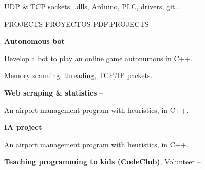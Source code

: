 \documentclass[letterpaper,MMMyyyy,nonstopmode]{simpleresumecv}
\newcommand\tab[1][0.5cm]{\hspace*{#1}}
\begin{document}
\begin{Body}
\tab UDP \& TCP sockets, .dlls, Arduino, PLC, drivers, git... 



\Gap



\Gap







\Gap

\hfill



\Section
{PROJECTS}
{PROYECTOS}
{PDF:PROJECTS}

\Entry



{\textbf{Autonomous bot}}
\hfill
{} --

\tab Develop a bot to play an online game autonumous in C++. 

\tab Memory scanning, threading, TCP/IP packets. 

\Gap


{\textbf{Web scraping \& statistics}}
\hfill
{} --

\tab  An airport management program with heuristics, in C++.

\Gap

{\textbf{IA project}}
\hfill
{}

\tab  An airport management program with heuristics, in C++.


\Gap

{\textbf{Teaching programming to kids (CodeClub)}, Volunteer}
\hfill
{} --


\end{Body}
\end{document}
